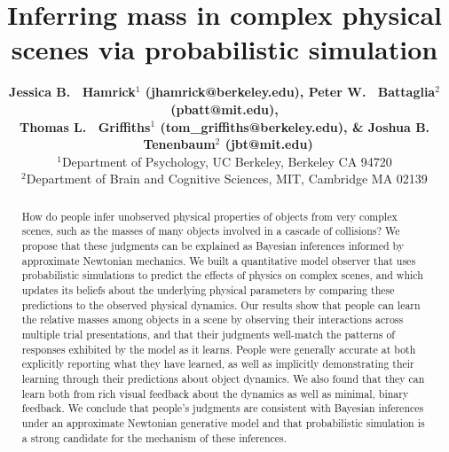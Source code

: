 \documentclass[10pt,letterpaper]{article}
\title{Inferring mass in complex physical scenes via probabilistic
  simulation}
\author{{\large \bf Jessica B. ~Hamrick$^1$ (jhamrick@berkeley.edu),
    Peter W. ~Battaglia$^2$ (pbatt@mit.edu),}\\
    {\large \bf Thomas L. ~Griffiths$^1$ (tom\_griffiths@berkeley.edu),
      \& Joshua B. ~Tenenbaum$^2$ (jbt@mit.edu)}\\
    $^1$Department of Psychology, UC Berkeley, Berkeley CA 94720\\
    $^2$Department of Brain and Cognitive Sciences, MIT, Cambridge MA 02139}
\begin{document}
\maketitle

\begin{abstract}
  How do people infer unobserved physical properties of objects from
  very complex scenes, such as the masses of many objects involved in
  a cascade of collisions? We propose that these judgments can be
  explained as Bayesian inferences informed by approximate Newtonian
  mechanics. We built a quantitative model observer that uses
  probabilistic simulations to predict the effects of physics on
  complex scenes, and which updates its beliefs about the underlying
  physical parameters by comparing these predictions to the observed
  physical dynamics. Our results show that people can learn the
  relative masses among objects in a scene by observing their
  interactions across multiple trial presentations, and that their
  judgments well-match the patterns of responses exhibited by the
  model as it learns. People were generally accurate at both
  explicitly reporting what they have learned, as well as implicitly
  demonstrating their learning through their predictions about object
  dynamics. We also found that they can learn both from rich visual
  feedback about the dynamics as well as minimal, binary feedback. We
  conclude that people's judgments are consistent with Bayesian
  inferences under an approximate Newtonian generative model and that
  probabilistic simulation is a strong candidate for the mechanism of
  these inferences.


\end{abstract}
\end{document}

